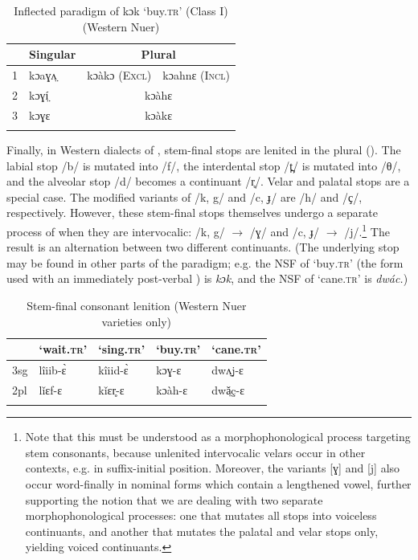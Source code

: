 \documentclass[output=paper
,newtxmath
,modfonts
,nonflat]{langsci/langscibook}
\begin{document}
\begin{table}
\begin{tabularx}{\textwidth}{XXXX} 
\lsptoprule
& Singular & \multicolumn{2}{c}{Plural}\\
\midrule
1 & kɔaɣʌ̤ & \multicolumn{1}{c}{kɔàkɔ (\textsc{Excl})} & kɔahnɛ (\textsc{Incl})\\
2 & kɔɣí̤ & \multicolumn{2}{c}{kɔàhɛ}\\
3 & kɔɣɛ & \multicolumn{2}{c}{kɔàkɛ}\\
\lspbottomrule
\end{tabularx}
\caption{Inflected paradigm of  kɔk ‘buy.\textsc{tr}’ (Class I) (Western Nuer)}
\label{tab:monich:10}
\end{table}

Finally, in Western dialects of , stem-final stops are lenited in the plural ().  The labial stop /b/ is mutated into /f/,  the interdental stop /t̪/ is mutated into /θ/, and the alveolar stop /d/ becomes a continuant /r̥/. Velar and palatal stops are a special case. The modified variants of /k, g/ and /c, ɟ/ are /h/ and /ҫ/, respectively. However, these stem-final stops themselves undergo a separate process of  when they are intervocalic: /k, g/ $\rightarrow$ /ɣ/ and /c, ɟ/ $\rightarrow$ /j/.\footnote{Note that this must be understood as a morphophonological process targeting stem consonants, because unlenited intervocalic velars occur in other contexts, e.g. in suffix-initial position. Moreover, the variants [ɣ] and [j] also occur word-finally in nominal forms which contain a lengthened vowel, further supporting the notion that we are dealing with two separate morphophonological  processes: one that mutates all stops into voiceless continuants, and another that mutates the palatal and velar stops only, yielding voiced continuants.} The result is an alternation between two different continuants. (The underlying stop may be found in other parts of the paradigm; e.g. the NSF of ‘buy\textsc{.tr}’ (the form used with an immediately post-verbal ) is \textit{kɔk}, and the NSF of ‘cane\textsc{.tr}’ is \textit{dwác.})  

\begin{table}
\begin{tabularx}{\textwidth}{XXXXX} 
\lsptoprule
& ‘wait.\textsc{tr}’ & ‘sing.\textsc{tr}’ & ‘buy.\textsc{tr}’ & ‘cane.\textsc{tr}’\\
\midrule
3sg & lîiib-ɛ̀ & kîiid-ɛ̀ & kɔɣ-ɛ & dwʌ̤j-ɛ\\
2pl & lǐɛf-ɛ & kǐɛr̥-ɛ & kɔàh-ɛ & dwǎ̤ç-ɛ\\
\lspbottomrule
\end{tabularx}
\caption{Stem-final consonant lenition (Western Nuer varieties only)}
\label{tab:monich:11}
\end{table}
\end{document}
